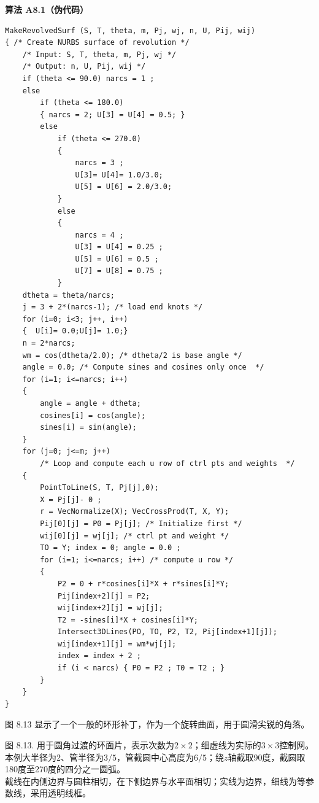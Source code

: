 \documentclass[../main.tex]{subfiles}
\begin{document}
\par\medskip\noindent\textbf{算法 A8.1（伪代码）}\par
\begin{verbatim}
MakeRevolvedSurf (S, T, theta, m, Pj, wj, n, U, Pij, wij)
{ /* Create NURBS surface of revolution */
    /* Input: S, T, theta, m, Pj, wj */
    /* Output: n, U, Pij, wij */
    if (theta <= 90.0) narcs = 1 ;
    else
        if (theta <= 180.0)
        { narcs = 2; U[3] = U[4] = 0.5; }
        else
            if (theta <= 270.0)
            {
                narcs = 3 ;
                U[3]= U[4]= 1.0/3.0;
                U[5] = U[6] = 2.0/3.0;
            }
            else
            {
                narcs = 4 ;
                U[3] = U[4] = 0.25 ;
                U[5] = U[6] = 0.5 ;
                U[7] = U[8] = 0.75 ;
            }
    dtheta = theta/narcs;
    j = 3 + 2*(narcs-1); /* load end knots */
    for (i=0; i<3; j++, i++)
    {  U[i]= 0.0;U[j]= 1.0;}
    n = 2*narcs;
    wm = cos(dtheta/2.0); /* dtheta/2 is base angle */
    angle = 0.0; /* Compute sines and cosines only once  */
    for (i=1; i<=narcs; i++)
    {
        angle = angle + dtheta;
        cosines[i] = cos(angle);
        sines[i] = sin(angle);
    }
    for (j=0; j<=m; j++)
        /* Loop and compute each u row of ctrl pts and weights  */
    {
        PointToLine(S, T, Pj[j],0);
        X = Pj[j]- 0 ;
        r = VecNormalize(X); VecCrossProd(T, X, Y);
        Pij[0][j] = P0 = Pj[j]; /* Initialize first */
        wij[0][j] = wj[j]; /* ctrl pt and weight */
        TO = Y; index = 0; angle = 0.0 ;
        for (i=1; i<=narcs; i++) /* compute u row */
        {
            P2 = 0 + r*cosines[i]*X + r*sines[i]*Y;
            Pij[index+2][j] = P2;
            wij[index+2][j] = wj[j];
            T2 = -sines[i]*X + cosines[i]*Y;
            Intersect3DLines(PO, TO, P2, T2, Pij[index+1][j]);
            wij[index+1][j] = wm*wj[j];
            index = index + 2 ;
            if (i < narcs) { P0 = P2 ; T0 = T2 ; }
        }
    }
}
\end{verbatim}

图 8.13 显示了一个一般的环形补丁，作为一个旋转曲面，用于圆滑尖锐的角落。



\begin{center}
\begin{minipage}{26cm}
\vspace*{.6\baselineskip}
\centering
{}
\par\smallskip
图 8.13. 用于圆角过渡的环面片，表示次数为$2\times2$；细虚线为实际的$3\times3$控制网。\\
本例大半径为2、管半径为$3/5$，管截圆中心高度为$6/5$；绕$z$轴截取90度，截圆取180度至270度的四分之一圆弧。\\
截线在内侧边界与圆柱相切，在下侧边界与水平面相切；实线为边界，细线为等参数线，采用透明线框。
\end{minipage}
\end{center}
\end{document}
